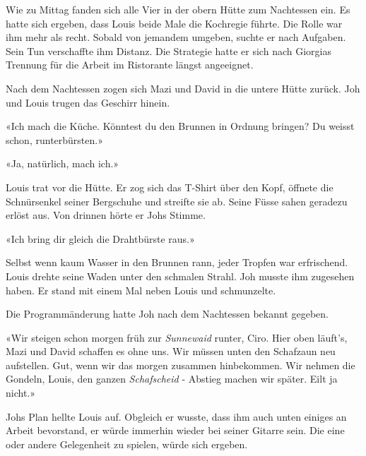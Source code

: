 \sectionbreak

Wie zu Mittag fanden sich alle Vier in der obern Hütte zum Nachtessen ein. 
Es hatte sich ergeben, dass Louis beide Male die Kochregie führte. 
Die Rolle war ihm mehr als recht. Sobald von jemandem umgeben, 
suchte er nach Aufgaben. Sein Tun verschaffte ihm Distanz. Die Strategie hatte er sich nach Giorgias Trennung für die Arbeit im Ristorante 
längst angeeignet. 

Nach dem Nachtessen zogen sich Mazi und David in die untere Hütte
zurück.
Joh und Louis trugen das Geschirr hinein.

«Ich mach die Küche. Könntest du den Brunnen in Ordnung bringen? Du
weisst schon, runterbürsten.»

«Ja, natürlich, mach ich.»

Louis trat vor die Hütte. Er zog sich das T-Shirt über den Kopf, öffnete
die Schnürsenkel seiner Bergschuhe und streifte sie ab. Seine Füsse
sahen geradezu erlöst aus.
Von drinnen hörte er Johs Stimme.

«Ich bring dir gleich die Drahtbürste raus.»

Selbst wenn kaum Wasser in den Brunnen rann, jeder Tropfen war
erfrischend. Louis drehte seine Waden unter den schmalen Strahl.
Joh musste ihm zugesehen haben. Er stand mit einem Mal neben Louis und schmunzelte.

\sectionbreak

Die Programmänderung hatte Joh nach dem Nachtessen bekannt gegeben.

«Wir steigen schon morgen früh zur \emph{Sunnewaid} runter, Ciro. Hier
oben läuft’s, Mazi und David schaffen es ohne uns. Wir müssen unten den Schafzaun neu aufstellen. 
Gut, wenn wir das morgen zusammen hinbekommen. Wir nehmen die Gondeln, Louis, den ganzen \emph{Schafscheid} - Abstieg machen wir später. Eilt ja nicht.» 

Johs Plan hellte Louis auf. Obgleich er wusste, dass ihm auch unten einiges an Arbeit bevorstand,
er würde immerhin wieder bei seiner Gitarre sein. Die eine oder andere Gelegenheit zu spielen, würde sich ergeben.

